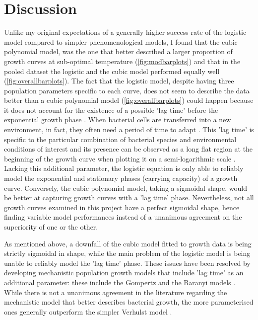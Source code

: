 \documentclass[a4paper]{article}
\begin{document}
\section{Discussion}
Unlike my original expectations of a generally higher success rate of the logistic model compared to simpler phenomenological models, I found that the cubic polynomial model, was the one that better described a larger proportion of growth curves at sub-optimal temperature (\ref{fig:modbarplots}) and that in the pooled dataset the logistic and the cubic model performed equally well (\ref{fig:overallbarplots}). 
The fact that the logistic model, despite having three population parameters specific to each curve, does not seem to describe the data better than a cubic polynomial model (\ref{fig:overallbarplots}) could happen because it does not account for the existence of a possible 'lag time' before the exponential growth phase \citep{PELEG2007808, BUCHANAN1997313, doi:10.1080/10408398.2011.570463}. When bacterial cells are transferred into a new environment, in fact, they often need a period of time to adapt \citep{BUCHANAN1997313}. This 'lag time' is specific to the particular combination of bacterial species and environmental conditions of interest and its presence can be observed as a long flat region at the beginning of the growth curve when plotting it on a semi-logarithmic scale \citep{BUCHANAN1997313, doi:10.1080/10408398.2011.570463}. Lacking this additional parameter, the logistic equation is only able to reliably model the exponential and stationary phases (carrying capacity) of a growth curve. Conversely, the cubic polynomial model, taking a sigmoidal shape, would be better at capturing growth curves with a 'lag time' phase. Nevertheless, not all growth curves examined in this project have a perfect sigmoidal shape, hence finding variable model performances instead of a unanimous agreement on the superiority of one or the other.\par

As mentioned above, a downfall of the cubic model fitted to growth data is being strictly sigmoidal in shape, while the main problem of the logistic model is being unable to reliably model the 'lag time' phase. These issues have been resolved by developing mechanistic population growth models that include 'lag time' as an additional parameter: these include the Gompertz and the Baranyi models \citep{BUCHANAN1997313, baranyi1993non}. While there is not a unanimous agreement in the literature regarding the mechanistic model that better describes bacterial growth, the more parameterised ones generally outperform the simpler Verhulst model \citep{zwietering1994modeling, BUCHANAN1997313, pla2015comparison}.\par 
\end{document}
